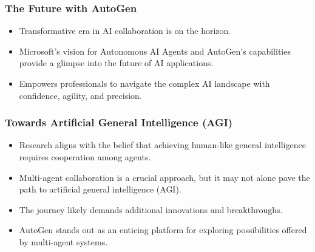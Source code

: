 \begin{frame}[fragile]\frametitle{The Future with AutoGen}
  \begin{itemize}
    \item Transformative era in AI collaboration is on the horizon.
    \item Microsoft’s vision for Autonomous AI Agents and AutoGen's capabilities provide a glimpse into the future of AI applications.
    \item Empowers professionals to navigate the complex AI landscape with confidence, agility, and precision.
  \end{itemize}
\end{frame}

\begin{frame}[fragile]\frametitle{Towards Artificial General Intelligence (AGI)}
  \begin{itemize}
    \item Research aligns with the belief that achieving human-like general intelligence requires cooperation among agents.
    \item Multi-agent collaboration is a crucial approach, but it may not alone pave the path to artificial general intelligence (AGI).
    \item The journey likely demands additional innovations and breakthroughs.
	\item AutoGen stands out as an enticing platform for exploring possibilities offered by multi-agent systems.
  \end{itemize}
\end{frame}
